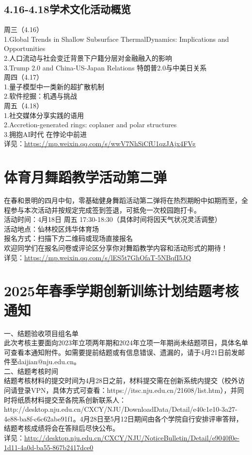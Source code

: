 \documentclass[letterpaper, 12pt]{article}
\begin{document}
\begin{multicols}{2}
\subsection{4.16-4.18学术文化活动概览}
周三（4.16）
\\1.Global Trends in Shallow Subsurface ThermalDynamics: Implications and Opportunities
\\2.人口流动与社会变迁背景下户籍分层对金融融入的影响
\\3.Trump 2.0 and China-US-Japan Relations 特朗普2.0与中美日关系
\\周四（4.17）
\\1.量子模型中一类新的超扩散机制
\\2.软件挖掘：机遇与挑战
\\周五（4.18）
\\1.社交媒体分享实践的语用
\\2.Accretion-generated rings: coplaner and polar structures
\\3.拥抱AI时代 在悖论中前进
\\详见：\url{https://mp.weixin.qq.com/s/wwV7NhSiCfU1qzJAjx4FVg}

\section{体育月舞蹈教学活动第二弹}
在春和景明的四月中旬，零基础健身舞蹈活动第二弹将在热烈期盼中如期而至，全程参与本次活动并按规定完成签到签退，可抵免一次校园跑打卡。
\\活动时间：4月18日 周五 17:30-18:30（具体时间将因天气状况灵活调整）
\\活动地点：仙林校区炜华体育场
\\报名方式：扫描下方二维码或现场直接报名
\\欢迎同学们在报名问卷或评论区分享你对舞蹈教学内容和活动形式的期待！
\\详见：\url{https://mp.weixin.qq.com/s/lES5t7GhOfaT-5NBqfI5JQ}

\section{2025年春季学期创新训练计划结题考核通知}
一、结题验收项目组名单
\\此次考核主要面向2023年立项两年期和2024年立项一年期尚未结题项目，具体名单可查看本通知附件。如需要提前结题或有信息错误、遗漏的，请于4月21日前发邮件至daijian@nju.edu.cn。
\\二、结题考核时间
\\结题考核材料的提交时间为4月28日之前，材料提交需在创新系统内提交（校外访问请登录VPN，具体方式可查看：https://itsc.nju.edu.cn/21608/list.htm），并同时将纸质材料提交至各院系创新联系人：http://desktop.nju.edu.cn/CXCY/NJU/DownloadData/Detail/e40c1e10-3a27-4e88-ba8f-c6c62abe91f1。4月28日至5月12日期间由各个学院自行安排评审答辩，结题考核成绩将会在答辩后尽快公布。
\\详见：\url{http://desktop.nju.edu.cn/CXCY/NJU/NoticeBulletin/Detail/e9040f0e-1d11-4a0d-ba55-867b2417dce0}

\end{multicols}
\end{document}
